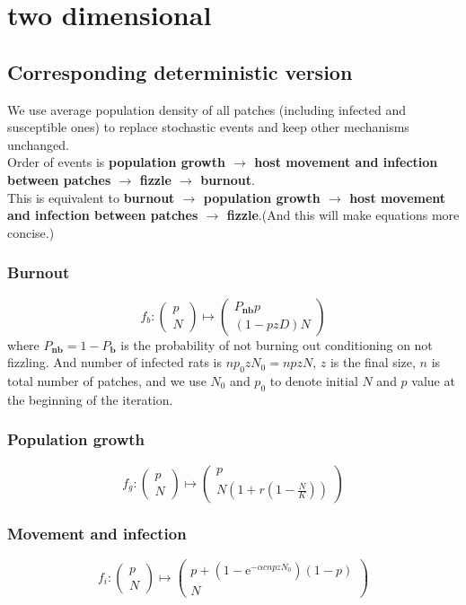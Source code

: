 \documentclass[12pt]{article}
\begin{document}
\section{two dimensional}
\subsection{Corresponding deterministic version}
We use average population density of all patches (including infected and susceptible ones) to replace stochastic events and keep other mechanisms unchanged. \\

Order of events is \textbf{population growth $\to$ host movement and infection between patches $\to$ fizzle $\to$ burnout}. \\

This is equivalent to \textbf{burnout $\to$ population growth $\to$ host movement and infection between patches $\to$ fizzle}.(And this will make equations more concise.)\\

\subsubsection{Burnout}
$$f_b:\begin{pmatrix}
    p\\N
\end{pmatrix}
\mapsto \begin{pmatrix}
    P_\textbf{nb}p\\
    (1-pzD)N
\end{pmatrix}$$
where $P_\textbf{nb}=1-P_\textbf{b}$ is the probability of not burning out conditioning on not fizzling. And number of infected rats is $np_0zN_0=npzN$, $z$ is the final size, $n$ is total number of patches, and we use $N_0$ and $p_0$ to denote initial $N$ and $p$ value at the beginning of the iteration. 

\subsubsection{Population growth}
$$f_g:\begin{pmatrix}
    p\\N
\end{pmatrix}
\mapsto \begin{pmatrix}
    p\\
    N(1+r(1-\frac{N}{K}))
\end{pmatrix}$$
\subsubsection{Movement and infection}
$$f_i:\begin{pmatrix}
    p\\N
\end{pmatrix}
\mapsto \begin{pmatrix}
    p+(1-\mathrm{e}^{-\alpha cnpzN_0})(1-p)\\
    N
\end{pmatrix}$$
\end{document}
